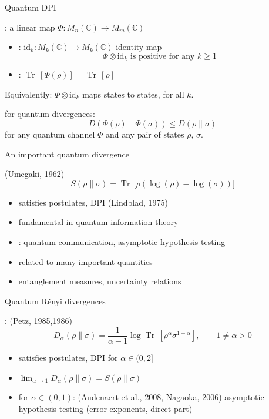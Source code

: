\documentclass[mathserif]{beamer}
\newcommand{\<}{\langle}
\renewcommand{\>}{\rangle}
\newcommand{\Tr}{\operatorname{Tr}\,}
\begin{document}
\begin{frame}{Quantum DPI}


:  a linear map $\Phi: M_n(\mathbb C)\to M_m(\mathbb C)$


\medskip

\begin{itemize}
\item {}:  
$\mathrm{id}_k :M_k(\mathbb C)\to M_k(\mathbb C)$ identity map
\[
\Phi\otimes \mathrm{id}_k\text{ is
positive for any }k\ge 1
\]
\item {}: $\Tr[\Phi(\rho)]=\Tr[\rho]$
\end{itemize}

\medskip
Equivalently: $\Phi\otimes \mathrm{id}_k$ maps states to states, for all $k$.

\bigskip
{} for quantum divergences:
\[
D(\Phi(\rho)\|\Phi(\sigma))\le D(\rho\|\sigma)
\]
for any quantum channel $\Phi$ and any pair of states $\rho$, $\sigma$.
\end{frame}



\begin{frame}{An important quantum divergence}

  {\small (Umegaki, 1962)}
\[
S(\rho\| \sigma)=\Tr\bigl[\rho\left(\log(\rho)-\log(\sigma)\right)\bigr]
\]

\begin{itemize}
\item satisfies postulates, DPI {\small (Lindblad, 1975)}
\vskip 2mm
\item fundamental in quantum information theory
\vskip 2mm
\item {}:  quantum communication, asymptotic
hypothesis testing
\item related to many important quantities
\item entanglement measures, uncertainty relations
\end{itemize}



\end{frame}

\begin{frame}{Quantum R\'enyi divergences}

: {\small (Petz, 1985,1986)}
\[
D_\alpha(\rho\|\sigma)=\frac1{\alpha-1}\log\Tr\left[\rho^\alpha\sigma^{1-\alpha}\right], \qquad 1\ne
\alpha>0
\]
\begin{itemize}
\item satisfies postulates, DPI for $\alpha\in (0,2]$
\vskip 3mm
\item $\lim_{\alpha\to 1} D_\alpha(\rho\|\sigma)=S(\rho\|\sigma)$
\vskip 3mm
\item {} for $\alpha\in (0,1)$: {\small (Audenaert et
al., 2008, Nagaoka, 2006)}
\vskip 2mm
asymptotic hypothesis testing (error
exponents, direct part) 

\end{itemize}

\end{frame}
\end{document}
